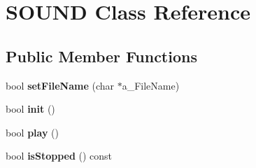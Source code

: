 \hypertarget{class_s_o_u_n_d}{}\section{S\+O\+U\+ND Class Reference}
\label{class_s_o_u_n_d}
\subsection*{Public Member Functions}
\begin{DoxyCompactItemize}
\item 
\mbox{\label{class_s_o_u_n_d_a7ceb7063b1ac86fadccccce1e60a70ec}} 
bool {\bfseries set\+File\+Name} (char $\ast$a\+\_\+\+File\+Name)
\item 
\mbox{\label{class_s_o_u_n_d_a9874a1ab004717156585656243974bc9}} 
bool {\bfseries init} ()
\item 
\mbox{\label{class_s_o_u_n_d_a9fba48663d11f72d78d1522eea1f4f13}} 
bool {\bfseries play} ()
\item 
\mbox{\label{class_s_o_u_n_d_a27cd0def63ebcede4c9820ac7a2bf2c8}} 
bool {\bfseries is\+Stopped} () const
\end{DoxyCompactItemize}

